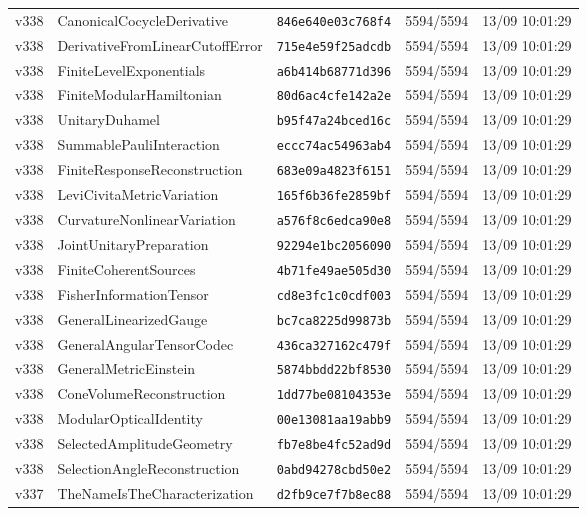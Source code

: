\documentclass[11pt]{article}
\theoremstyle{definition}\newtheorem{deriv}{Derivation}
\begin{document}
{\begin{longtable}{@{}lllll@{}}
v338 & CanonicalCocycleDerivative & \texttt{846e640e03c768f4} & 5594/5594 & 13/09 10:01:29 \\
v338 & DerivativeFromLinearCutoffError & \texttt{715e4e59f25adcdb} & 5594/5594 & 13/09 10:01:29 \\
v338 & FiniteLevelExponentials & \texttt{a6b414b68771d396} & 5594/5594 & 13/09 10:01:29 \\
v338 & FiniteModularHamiltonian & \texttt{80d6ac4cfe142a2e} & 5594/5594 & 13/09 10:01:29 \\
v338 & UnitaryDuhamel & \texttt{b95f47a24bced16c} & 5594/5594 & 13/09 10:01:29 \\
v338 & SummablePauliInteraction & \texttt{eccc74ac54963ab4} & 5594/5594 & 13/09 10:01:29 \\
v338 & FiniteResponseReconstruction & \texttt{683e09a4823f6151} & 5594/5594 & 13/09 10:01:29 \\
v338 & LeviCivitaMetricVariation & \texttt{165f6b36fe2859bf} & 5594/5594 & 13/09 10:01:29 \\
v338 & CurvatureNonlinearVariation & \texttt{a576f8c6edca90e8} & 5594/5594 & 13/09 10:01:29 \\
v338 & JointUnitaryPreparation & \texttt{92294e1bc2056090} & 5594/5594 & 13/09 10:01:29 \\
v338 & FiniteCoherentSources & \texttt{4b71fe49ae505d30} & 5594/5594 & 13/09 10:01:29 \\
v338 & FisherInformationTensor & \texttt{cd8e3fc1c0cdf003} & 5594/5594 & 13/09 10:01:29 \\
v338 & GeneralLinearizedGauge & \texttt{bc7ca8225d99873b} & 5594/5594 & 13/09 10:01:29 \\
v338 & GeneralAngularTensorCodec & \texttt{436ca327162c479f} & 5594/5594 & 13/09 10:01:29 \\
v338 & GeneralMetricEinstein & \texttt{5874bbdd22bf8530} & 5594/5594 & 13/09 10:01:29 \\
v338 & ConeVolumeReconstruction & \texttt{1dd77be08104353e} & 5594/5594 & 13/09 10:01:29 \\
v338 & ModularOpticalIdentity & \texttt{00e13081aa19abb9} & 5594/5594 & 13/09 10:01:29 \\
v338 & SelectedAmplitudeGeometry & \texttt{fb7e8be4fc52ad9d} & 5594/5594 & 13/09 10:01:29 \\
v338 & SelectionAngleReconstruction & \texttt{0abd94278cbd50e2} & 5594/5594 & 13/09 10:01:29 \\
v337 & TheNameIsTheCharacterization & \texttt{d2fb9ce7f7b8ec88} & 5594/5594 & 13/09 10:01:29 \\

\end{longtable}}
\end{document}
